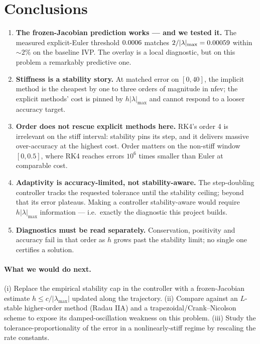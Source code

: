 ﻿\documentclass[11pt,a4paper]{article}
\begin{document}
\section{Conclusions}
\begin{enumerate}
\item \textbf{The frozen-Jacobian prediction works --- and we tested it.}  The
measured explicit-Euler threshold $0.0006$ matches $2/|\lambda|_{\max}
=0.00059$ within $\sim2\%$ on the baseline IVP.  The overlay is a local
diagnostic, but on this problem a remarkably predictive one.
\item \textbf{Stiffness is a stability story.}  At matched error on
$[0,40]$, the implicit method is the cheapest by one to three orders of
magnitude in nfev; the explicit methods' cost is pinned by $h|\lambda|_{\max}$
and cannot respond to a looser accuracy target.
\item \textbf{Order does not rescue explicit methods here.}  RK4's order 4 is
irrelevant on the stiff interval: stability pins its step, and it delivers
massive over-accuracy at the highest cost.  Order matters on the non-stiff
window $[0,0.5]$, where RK4 reaches errors $10^6$ times smaller than Euler at
comparable cost.
\item \textbf{Adaptivity is accuracy-limited, not stability-aware.}  The
step-doubling controller tracks the requested tolerance until the stability
ceiling; beyond that its error plateaus.  Making a controller stability-aware
would require $h|\lambda|_{\max}$ information --- i.e.\ exactly the diagnostic
this project builds.
\item \textbf{Diagnostics must be read separately.}  Conservation, positivity
and accuracy fail in that order as $h$ grows past the stability limit;
no single one certifies a solution.
\end{enumerate}

\paragraph{What we would do next.}  (i) Replace the empirical stability cap in
the controller with a frozen-Jacobian estimate $h\le c/|\lambda_{\max}|$
updated along the trajectory.  (ii) Compare against an $L$-stable higher-order
method (Radau IIA) and a trapezoidal/Crank--Nicolson scheme to expose its
damped-oscillation weakness on this problem.  (iii) Study the
tolerance-proportionality of the error in a nonlinearly-stiff regime by
rescaling the rate constants.
\end{document}
